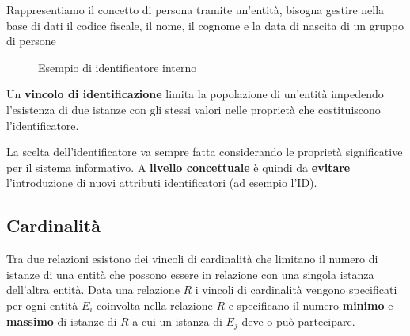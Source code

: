 \documentclass[a4paper]{article}
\begin{document}
\begin{example}
  Rappresentiamo il concetto di persona tramite un'entità, bisogna gestire nella base
  di dati il codice fiscale, il nome, il cognome e la data di nascita di un gruppo
  di persone
  \begin{figure}[H]
    \centering
    \caption{Esempio di identificatore interno}
  \end{figure}
\end{example}

\begin{definition}
  Un \textbf{vincolo di identificazione} limita la popolazione di un'entità impedendo
  l'esistenza di due istanze con gli stessi valori nelle proprietà che costituiscono
  l'identificatore.

  \vspace{1em}
  \noindent
  La scelta dell'identificatore va sempre fatta considerando le proprietà significative
  per il sistema informativo. A \textbf{livello concettuale} è quindi da \textbf{evitare}
  l'introduzione di nuovi attributi identificatori (ad esempio l'ID).
\end{definition}

\subsection{Cardinalità}
Tra due relazioni esistono dei vincoli di cardinalità che limitano il numero di istanze
di una entità che possono essere in relazione con una singola istanza dell'altra entità.
Data una relazione \( R \) i vincoli di cardinalità vengono specificati per ogni entità
\( E_i \) coinvolta nella relazione \( R \) e specificano il numero \textbf{minimo} e
\textbf{massimo} di istanze di \( R \) a cui un istanza di \( E_j \) deve o può 
partecipare.
\end{document}
